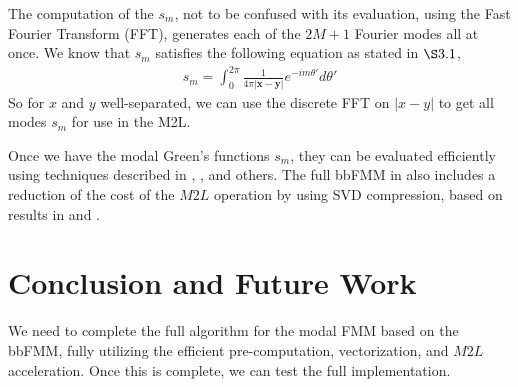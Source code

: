 \documentclass[11pt, oneside]{article}   	%
\begin{document}
The computation of the $s_m$, not to be confused with its evaluation, using the Fast Fourier Transform (FFT), generates each of the $2M+1$ Fourier modes all at once. We know that $s_m$ satisfies the following equation as stated in $\S3.1$,
\begin{align}
s_m = \int_0^{2\pi} \frac{1}{4\pi|\mathbf{x}-\mathbf{y}|}e^{-im\theta'}d\theta'
\end{align}
So for $x$ and $y$ well-separated, we can use the discrete FFT on $|x-y|$ to get all modes $s_m$ for use in the M2L.

Once we have the modal Green's functions $s_m$, they can be evaluated efficiently using techniques described in \cite{A}, \cite{VBT}, and others. The full bbFMM in \cite{FD} also includes a reduction of the cost of the $M2L$ operation by using SVD compression, based on results in \cite{CGMR} and \cite{MR}.

\section{Conclusion and Future Work}
We need to complete the full algorithm for the modal FMM based on the bbFMM, fully utilizing the efficient pre-computation, vectorization, and $M2L$ acceleration. Once this is complete, we can test the full implementation.
\end{document}
